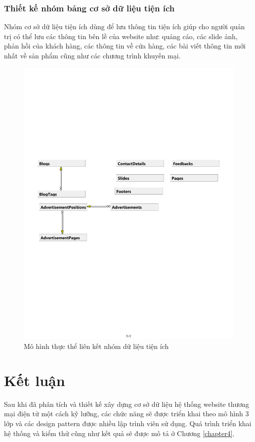 \subsubsection{Thiết kế nhóm bảng cơ sở dữ liệu tiện ích}
Nhóm cơ sở dữ liệu tiện ích dùng để lưu thông tin tiện ích giúp cho người quản trị có thể lưu các thông tin bên lề của website như: quảng cáo, các slide ảnh, phản hồi của khách hàng, các thông tin về cửa hàng, các bài viết thông tin mới nhất về sản phẩm cũng như các chương trình khuyến mại.
\begin{center}
    \begin{figure}[h]
    \begin{center}
     \includegraphics[scale=0.7]{image/E-RUtil.pdf}
    \end{center}
    \caption{Mô hình thực thể liên kết nhóm dữ liệu tiện ích}
    \label{refhinh3_13}
    \end{figure}
\end{center}

\section{Kết luận}
Sau khi đã phân tích và thiết kế xây dựng cơ sở dữ liệu hệ thống website thương mại điện tử một cách kỹ lưỡng, các chức năng sẽ được triển khai theo mô hình 3 lớp và các design pattern được nhiều lập trình viên sử dụng. Quá trình triển khai hệ thống và kiểm thử cũng như kết quả sẽ được mô tả ở Chương \ref{chapter4}. 






